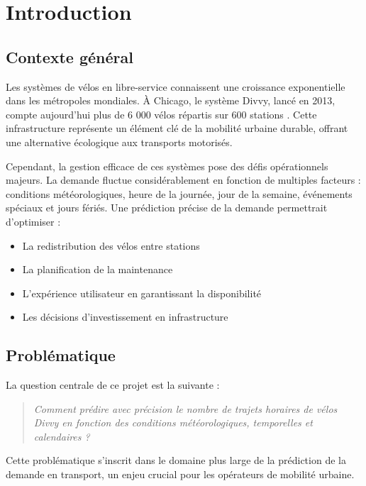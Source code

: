 \documentclass[12pt,a4paper]{article}
\begin{document}
\section{Introduction}

\subsection{Contexte général}

Les systèmes de vélos en libre-service connaissent une croissance exponentielle dans les métropoles mondiales. À Chicago, le système Divvy, lancé en 2013, compte aujourd'hui plus de 6 000 vélos répartis sur 600 stations \citep{divvy2024}. Cette infrastructure représente un élément clé de la mobilité urbaine durable, offrant une alternative écologique aux transports motorisés.

Cependant, la gestion efficace de ces systèmes pose des défis opérationnels majeurs. La demande fluctue considérablement en fonction de multiples facteurs : conditions météorologiques, heure de la journée, jour de la semaine, événements spéciaux et jours fériés. Une prédiction précise de la demande permettrait d'optimiser :

\begin{itemize}
    \item La redistribution des vélos entre stations
    \item La planification de la maintenance
    \item L'expérience utilisateur en garantissant la disponibilité
    \item Les décisions d'investissement en infrastructure
\end{itemize}

\subsection{Problématique}

La question centrale de ce projet est la suivante :

\begin{quote}
\textit{Comment prédire avec précision le nombre de trajets horaires de vélos Divvy en fonction des conditions météorologiques, temporelles et calendaires ?}
\end{quote}

Cette problématique s'inscrit dans le domaine plus large de la prédiction de la demande en transport, un enjeu crucial pour les opérateurs de mobilité urbaine.
\end{document}
